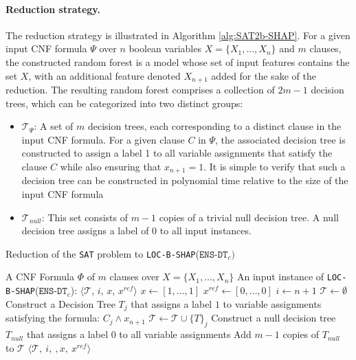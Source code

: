 \paragraph{Reduction strategy.} The reduction strategy is illustrated in Algorithm \ref{alg:SAT2b-SHAP}. For a given input CNF formula $\Psi$ over $n$ boolean variables $X = \{X_{1}, \ldots, X_{n}\}$ and $m$ clauses, the constructed random forest is a model whose set of input features contains the set $X$, with an additional feature denoted $X_{n+1}$ added for the sake of the reduction. The resulting random forest comprises a collection of $2m - 1$ decision trees, which can be categorized into two distinct groups:
\begin{itemize}
    \item $\mathcal{T}_{\Psi}$: A set of $m$ decision trees, each corresponding to a distinct clause in the input CNF formula. For a given clause $C$ in $\Psi$, the associated decision tree is constructed to assign a label 1 to all variable assignments that satisfy the clause $C$  while also ensuring that $x_{n+1} = 1$. It is simple to verify that such a decision tree can be constructed in polynomial time relative to the size of the input CNF formula
    \item \( \mathcal{T}_{null} \): This set consists of \( m - 1 \) copies of a trivial null decision tree. A null decision tree assigns a label of 0 to all input instances. 
\end{itemize}
\begin{algorithm}
\caption{Reduction of the \texttt{SAT} problem to \texttt{LOC-B-SHAP}($\texttt{ENS-DT}_{c})$}
\label{alg:SAT2b-SHAP}
\begin{algorithmic}[1]
\REQUIRE A CNF Formula $\Phi$ of $m$ clauses over $X = \{X_{1}, \ldots, X_{n} \}$
\ENSURE An input instance of \texttt{LOC-B-SHAP}($\texttt{ENS-DT}_{c}$): $\langle\mathcal{T}$, $i$, $x$, $x^{ref}\rangle$
\STATE $x \leftarrow [1 , \ldots , 1]$
\STATE $x^{ref} \leftarrow [0, \ldots , 0]$
\STATE $i \leftarrow n+1$
\STATE $\mathcal{T} \leftarrow \emptyset$
 \STATE Construct a Decision Tree $T_{j}$ that assigns a label $1$ to variable assignments satisfying the formula: $C_{j} \land x_{n+1}$
 \STATE $\mathcal{T} \leftarrow \mathcal{T} \cup \{T\}_{j}$
\ENDFOR
 \STATE Construct a null decision tree $T_{null}$ that assigns a label $0$ to all variable assignments
 \STATE Add $m-1$ copies of $T_{null}$ to $\mathcal{T}$
\RETURN $\langle\mathcal{T},~i,~,x,~x^{ref}\rangle$
\end{algorithmic}
\end{algorithm}

